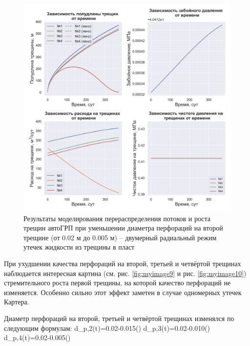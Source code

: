 \begin{figure}[H] 
\center
\includegraphics[width=\linewidth]{images/myimage8.jpg}
\caption{Результаты моделирования перераспределения потоков и роста трещин автоГРП при уменьшении диаметра перфораций на второй трещине (от 0.02 м до 0.005 м) -- двумерный радиальный режим утечек жидкости из трещины в пласт}
\label{fig:myimage8}
\end{figure}

При ухудшении качества перфораций на второй, третьей и четвёртой трещинах наблюдается интересная картина (см. рис. \ref{fig:myimage9} и рис. \ref{fig:myimage10}) стремительного роста первой трещины, на которой качество перфораций не изменяется.
Особенно сильно этот эффект заметен в случае одномерных утечек Картера.

Диаметр перфораций на второй, третьей и четвёртой трещинах изменялся по следующим формулам:
\beq
d_{p,2}(t)=0.02-0.015\cdot\left(\right)
\eeq
\beq
d_{p,3}(t)=0.02-0.010\cdot\left(\right)
\eeq
\beq
d_{p,4}(t)=0.02-0.005\cdot\left(\right)
\eeq

